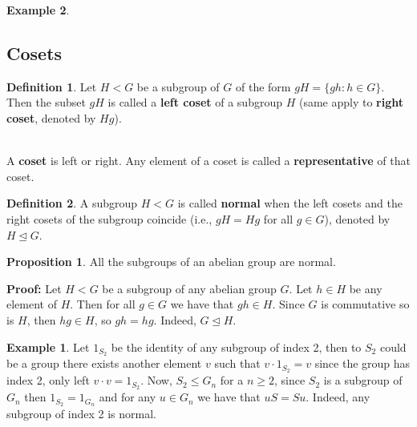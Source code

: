 \documentclass[11pt]{amsbook}%
\theoremstyle{plain}
\theoremstyle{definition}
\newtheorem{definition*}{Definition}
\newtheorem*{example*}{Example}
\newtheorem{proposition}[theorem]{Proposition}
\numberwithin{equation}{section}
\DeclareMathOperator{\Ker}{Ker}
\DeclareMathOperator{\im}{Im}
\newcommand{\leftnormal}{\trianglelefteq}
\begin{document}
\begin{example*}

\subsection{Cosets}
\begin{definition*}
  Let $H < G$ be a subgroup of $G$ of the form $gH = \{gh: h \in G\}$. Then 
  the subset $gH$ is called a \textbf{left coset} of a subgroup $H$
  (same apply to \textbf{right coset}, denoted by $Hg$).
\end{definition*} \\
A \textbf{coset} is left or right. Any element of a coset is called a
\textbf{representative} of that coset.

\begin{definition*}
  A subgroup $H < G$ is called \textbf{normal} when the left cosets and
  the right cosets of the subgroup coincide (i.e., $gH = Hg$ for all $g \in G$),
  denoted by $H \leftnormal G$.
\end{definition*}

\begin{proposition}
  All the subgroups of an abelian group are normal.
\end{proposition} \vspace{1.8em}
\textbf{Proof: }Let $H < G$ be a subgroup of any abelian group $G$. Let $h \in H$
be any element of $H$. Then for all $g \in G$ we have that $gh \in H$.
Since $G$ is commutative so is $H$, then $hg \in H$, so $gh = hg$. Indeed,
$G \leftnormal H$. \qedsymbol

\begin{example*}
  Let $1_{S_{2}}$ be the identity of any subgroup of index 2, then to
  $S_{2}$ could be a group there exists another element $v$
  such that $v \cdot  1_{S_{2}} = v$ since the group has index
  2, only left $v \cdot v = 1_{S_{2}}$. Now, $S_{2} \leq G_{n}$
  for a $n \geq 2$, since $S_{2}$ is a subgroup of $G_{n}$ then
  $1_{S_{2}} = 1_{G_{n}}$ and for any $u \in G_{n}$ we have that
  $uS = Su$. Indeed, any subgroup of index 2 is normal. \qedsymbol
\end{example*}


\end{example*}
\end{document}
